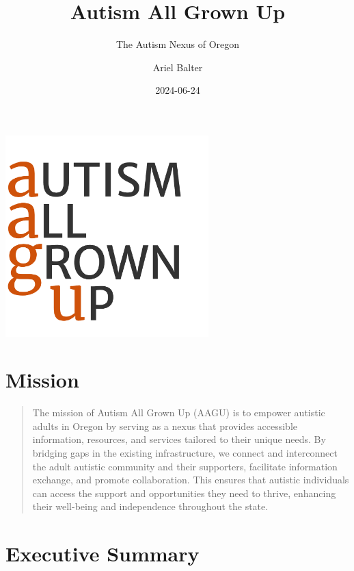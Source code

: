 \documentclass[
  letterpaper,
  DIV=11,
  numbers=noendperiod]{scrreprt}
\title{Autism All Grown Up}
\subtitle{The Autism Nexus of Oregon}
\author{Ariel Balter}
\date{2024-06-24}
\renewcommand*\contentsname{Table of contents}
\newcommand\contentsname{Table of contents}
\begin{document}
\maketitle

\renewcommand*\contentsname{Contents}
{
\hypersetup{linkcolor=}
\setcounter{tocdepth}{1}
\tableofcontents
}

\chapter{}\label{section}

\includegraphics[width=3.09896in,height=3.05923in]{./media/image4.png}


\chapter{Mission}\label{sec-mission}

\begin{quote}
The mission of Autism All Grown Up (AAGU) is to empower autistic adults
in Oregon by serving as a nexus that provides accessible information,
resources, and services tailored to their unique needs. By bridging gaps
in the existing infrastructure, we connect and interconnect the adult
autistic community and their supporters, facilitate information
exchange, and promote collaboration. This ensures that autistic
individuals can access the support and opportunities they need to
thrive, enhancing their well-being and independence throughout the
state.
\end{quote}


\chapter{Executive Summary}\label{sec-executive_summary}
\end{document}
